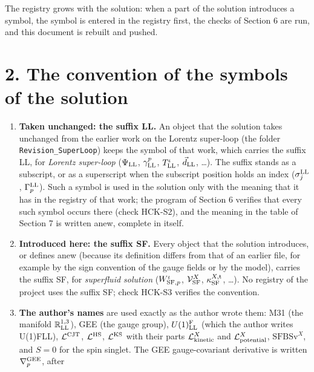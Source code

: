 \documentclass[
  10pt,
]{article}
\providecommand{\tightlist}{%
  \setlength{\itemsep}{0pt}\setlength{\parskip}{0pt}}
\begin{document}
The registry grows with the solution: when a part of the solution
introduces a symbol, the symbol is entered in the registry first, the
checks of Section 6 are run, and this document is rebuilt and pushed.

\hypertarget{the-convention-of-the-symbols-of-the-solution}{%
\section{2. The convention of the symbols of the
solution}\label{the-convention-of-the-symbols-of-the-solution}}

\begin{enumerate}
\def\labelenumi{\arabic{enumi}.}
\tightlist
\item
  \textbf{Taken unchanged: the suffix LL.} An object that the solution
  takes unchanged from the earlier work on the Lorentz super-loop (the
  folder \texttt{Revision\_SuperLoop}) keeps the symbol of that work,
  which carries the suffix LL, for \emph{Lorentz super-loop}
  (\(\Psi_{\rm LL}\), \(\gamma^p_{\rm LL}\), \(T^\iota_{\rm LL}\),
  \(\vec d_{\rm LL}\), \ldots). The suffix stands as a subscript, or as
  a superscript when the subscript position holds an index
  (\(\sigma^{\rm LL}_j\), \(\Gamma^{\rm LL}_p\)). Such a symbol is used
  in the solution only with the meaning that it has in the registry of
  that work; the program of Section 6 verifies that every such symbol
  occurs there (check HCK-S2), and the meaning in the table of Section 7
  is written anew, complete in itself.
\item
  \textbf{Introduced here: the suffix SF.} Every object that the
  solution introduces, or defines anew (because its definition differs
  from that of an earlier file, for example by the sign convention of
  the gauge fields or by the model), carries the suffix SF, for
  \emph{superfluid solution} (\(W^\iota_{{\rm SF},p}\),
  \(\mathcal V^X_{\rm SF}\), \(\kappa^{X,{\rm t}}_{\rm SF}\), \ldots).
  No registry of the project uses the suffix SF; check HCK-S3 verifies
  the convention.
\item
  \textbf{The author's names} are used exactly as the author wrote them:
  M31 (the manifold \(\mathbb R^{1,3}_{\rm LL}\)), GEE (the gauge
  group), \(U(1)^{\rm F}_{\rm LL}\) (which the author writes U(1)FLL),
  \(\mathcal L^{\rm CJT}\), \(\mathcal L^{\rm HS}\),
  \(\mathcal L^{\rm KS}\) with their parts
  \(\mathcal L^X_{\rm kinetic}\) and \(\mathcal L^X_{\rm potential}\),
  \(\mathrm{SFBSv}^X\), and \(S=0\) for the spin singlet. The GEE
  gauge-covariant derivative is written \(\nabla^{\rm GEE}_p\), after

\end{enumerate}
\end{document}
